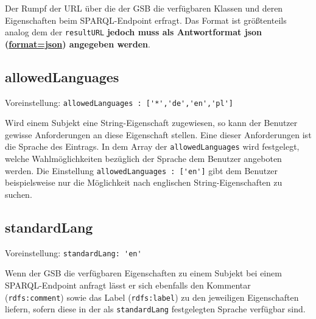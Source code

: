 Der Rumpf der URL über die der GSB die verfügbaren Klassen und deren
Eigenschaften beim SPARQL-Endpoint erfragt.
Das Format ist größtenteils analog dem der \verb+resultURL+ \textbf{jedoch
muss als Antwortformat json (\url{format=json}) angegeben werden}.

\subsection{allowedLanguages}

Voreinstellung: \verb#allowedLanguages : ['*','de','en','pl']#\smallskip

\noindent Wird einem Subjekt eine String-Eigenschaft zugewiesen, so
kann der Benutzer gewisse Anforderungen an diese Eigenschaft stellen.
Eine dieser Anforderungen ist die Sprache des Eintrags.
In dem Array der \verb#allowedLanguages# wird festgelegt, welche
Wahlmöglichkeiten bezüglich der Sprache dem Benutzer angeboten
werden. Die Einstellung \verb#allowedLanguages : ['en']# gibt dem
Benutzer beispielsweise nur die Möglichkeit nach englischen
String-Eigenschaften zu suchen.


\subsection{standardLang}

Voreinstellung: \verb#standardLang: 'en'#\smallskip

\noindent Wenn der GSB die verfügbaren Eigenschaften zu einem Subjekt bei einem
SPARQL-Endpoint anfragt lässt er sich ebenfalls den Kommentar
(\verb+rdfs:comment+) sowie das Label (\verb+rdfs:label+) zu den
jeweiligen Eigenschaften liefern, sofern diese in der als
\verb#standardLang# festgelegten Sprache verfügbar sind.

